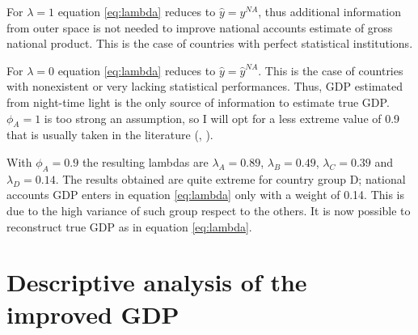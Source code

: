 For $\lambda=1$ equation \ref{eq:lambda} reduces to $\hat{y}=y^{NA}$, thus additional information from outer space is not needed to improve national accounts estimate of gross national product. This is the case of countries with perfect statistical institutions.

For $\lambda=0$ equation \ref{eq:lambda} reduces to $\hat{y}=\hat{y}^{NA}$. This is the case of countries with nonexistent or very lacking statistical performances. Thus, GDP estimated from night-time light is the only source of information to estimate true GDP.
$\phi_A=1$ is too strong an assumption, so I will opt for a less extreme value of 0.9 that is usually taken in the literature (\citet{henderson2012measuring}, \citet{chen2021chasing}).

With $\phi_A=0.9$ the resulting lambdas are $\lambda_A=0.89$, $\lambda_B=0.49$, $\lambda_C=0.39$ and $\lambda_D=0.14$.
The results obtained are quite extreme for country group D; national accounts GDP enters in equation \ref{eq:lambda} only with a weight of 0.14. This is due to the high variance of such group respect to the others.
It is now possible to reconstruct true GDP as in equation \ref{eq:lambda}.

\section{Descriptive analysis of the improved GDP}

